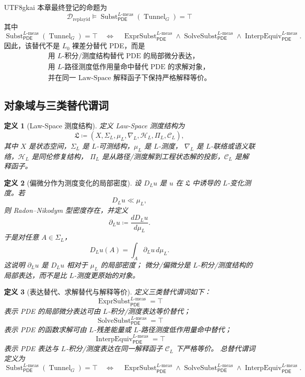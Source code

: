 \documentclass[12pt]{article}
\newtheorem{definition}{定义}[section]
\newcommand{\DefEq}{\coloneqq}
\newcommand{\PDE}{\ensuremath{\mathsf{PDE}}}
\DeclareMathOperator{\Tunnel}{Tunnel}
\DeclareMathOperator{\Subst}{Subst}
\DeclareMathOperator{\ExprSubst}{ExprSubst}
\DeclareMathOperator{\SolveSubst}{SolveSubst}
\DeclareMathOperator{\InterpEquiv}{InterpEquiv}
\newcommand{\Lmeas}{L\text{-}\mathrm{meas}}
\begin{document}
\begin{CJK*}{UTF8}{gkai}
本章最终登记的命题为
\[
  \boxed{
  \mathcal D_{\mathrm{replayid}}
  \models
  \Subst_{\PDE}^{\Lmeas}(\Tunnel_G)=\top
  }
\]
其中
\[
  \Subst_{\PDE}^{\Lmeas}(\Tunnel_G)=\top
  \quad\Longleftrightarrow\quad
  \ExprSubst_{\PDE}^{\Lmeas}
  \wedge
  \SolveSubst_{\PDE}^{\Lmeas}
  \wedge
  \InterpEquiv_{\PDE}^{\Lmeas}.
\]
因此，该替代不是 \(L_0\) 裸差分替代 PDE，而是
\[
  \boxed{
  \begin{gathered}
  \text{用 }L\text{-积分/测度结构替代 PDE 的局部微分表达，}\\
  \text{用 }L\text{-路径测度低作用量命中替代 PDE 的求解对象，}\\
  \text{并在同一 Law-Space 解释函子下保持严格解释等价。}
  \end{gathered}
  }
\]

\subsection{对象域与三类替代谓词}
\label{subsec:tex58-l-measure-domain-definitions}

\begin{definition}[Law-Space 测度结构]
\label{def:tex58-lawspace-measure-structure}
定义 Law-Space 测度结构为
\[
  \mathfrak L
  \DefEq
  (X,\Sigma_L,\mu_L,\nabla_L,\mathcal H_L,\Pi_L,\mathcal C_L),
\]
其中 \(X\) 是状态空间，\(\Sigma_L\) 是 \(L\)-可测结构，\(\mu_L\) 是 \(L\)-测度，
\(\nabla_L\) 是 \(L\)-联络或语义联络，\(\mathcal H_L\) 是同伦修复结构，
\(\Pi_L\) 是从路径/测度解到工程状态解的投影，\(\mathcal C_L\) 是解释函子。
\end{definition}

\begin{definition}[偏微分作为测度变化的局部密度]
\label{def:tex58-partial-as-density}
设 \(D_Lu\) 是 \(u\) 在 \(\mathfrak L\) 中诱导的 \(L\)-变化测度。若
\[
  D_Lu\ll \mu_L,
\]
则 Radon--Nikodym 型密度存在，并定义
\[
  \partial_Lu
  \DefEq
  \frac{dD_Lu}{d\mu_L}.
\]
于是对任意 \(A\in\Sigma_L\)，
\[
  D_Lu(A)
  =
  \int_A \partial_Lu\,d\mu_L.
\]
这说明 \(\partial_Lu\) 是 \(D_Lu\) 相对于 \(\mu_L\) 的局部密度；
微分/偏微分是 \(L\)-积分/测度结构的局部表达，而不是比 \(L\)-测度更原始的对象。
\end{definition}

\begin{definition}[表达替代、求解替代与解释等价]
\label{def:tex58-three-l-measure-substitutions}
定义三类替代谓词如下：
\[
  \ExprSubst_{\PDE}^{\Lmeas}=\top
\]
表示 PDE 的局部微分表达可由 \(L\)-积分/测度表达等价替代；
\[
  \SolveSubst_{\PDE}^{\Lmeas}=\top
\]
表示 PDE 的函数求解可由 \(L\)-残差能量或 \(L\)-路径测度低作用量命中替代；
\[
  \InterpEquiv_{\PDE}^{\Lmeas}=\top
\]
表示 PDE 表达与 \(L\)-积分/测度表达在同一解释函子 \(\mathcal C_L\) 下严格等价。
总替代谓词定义为
\[
  \Subst_{\PDE}^{\Lmeas}(\Tunnel_G)=\top
  \quad\Longleftrightarrow\quad
  \ExprSubst_{\PDE}^{\Lmeas}
  \wedge
  \SolveSubst_{\PDE}^{\Lmeas}
  \wedge
  \InterpEquiv_{\PDE}^{\Lmeas}.
\]
\end{definition}


\end{CJK*}
\end{document}
